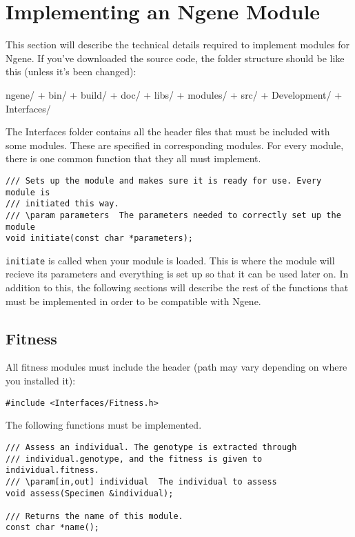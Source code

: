 \appendix

\section{Implementing an Ngene Module}
This section will describe the technical details required to implement modules for Ngene. If you've downloaded the source code, the folder structure should be like this (unless it's been changed):

\begin{verbatimtab}
ngene/
 + bin/
 + build/
 + doc/
 + libs/
 + modules/
 + src/
   + Development/
   + Interfaces/
\end{verbatimtab}

\noindent The Interfaces folder contains all the header files that must be included with some modules. These are specified in corresponding modules. For every module, there is one common function that they all must implement.

\begin{verbatim}
/// Sets up the module and makes sure it is ready for use. Every module is
/// initiated this way.
/// \param parameters  The parameters needed to correctly set up the module
void initiate(const char *parameters);
\end{verbatim}

\noindent\texttt{initiate} is called when your module is loaded. This is where the module will recieve its parameters and everything is set up so that it can be used later on. In addition to this, the following sections will describe the rest of the functions that must be implemented in order to be compatible with Ngene.

\subsection{Fitness}

All fitness modules must include the header (path may vary depending on where you installed it):

\begin{verbatim}
#include <Interfaces/Fitness.h>
\end{verbatim}

\noindent The following functions must be implemented.

\begin{verbatim}
/// Assess an individual. The genotype is extracted through
/// individual.genotype, and the fitness is given to individual.fitness.
/// \param[in,out] individual  The individual to assess
void assess(Specimen &individual);

/// Returns the name of this module.
const char *name();
\end{verbatim}

